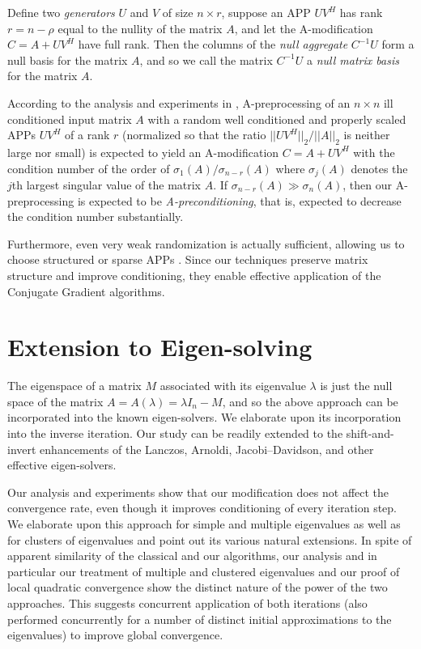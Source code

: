 \documentclass{report}
\begin{document}
Define two {\em generators} $U$ and $V$ of size $n \times r$, suppose an
APP $UV^H$ has rank $r=n-\rho$ equal to the nullity of the matrix $A$,
and let the A-modification $C=A+UV^H$ have full rank. Then the columns of
the {\em null aggregate} $C^{-1}U$ form a null basis for the matrix $A$,
and so we call the matrix $C^{-1}U$ a {\em null matrix basis} for the
matrix $A$.

According to the analysis and experiments in \cite{apf},
A-preprocessing of an $n\times n$ ill conditioned input matrix $A$ with a
random well conditioned and properly scaled APPs $UV^H$ of a rank $r$
(normalized so that the ratio $||UV^H||_2/||A||_2$ is neither large nor
small) is expected to yield an A-modification $C=A+UV^H$ with the
condition number of the order of $\sigma_{1}(A)/\sigma_{n-r}(A)$ where
$\sigma_j(A)$ denotes the $j$th largest singular value of the matrix $A$.
If $\sigma_{n-r}(A)\gg \sigma_{n}(A)$, then our A-preprocessing is
expected to be {\em A-preconditioning}, that is, expected to decrease the
condition number substantially.

Furthermore, even very weak randomization is actually sufficient,
allowing us to choose structured or sparse APPs \cite[Examples
4.1--4.6]{apf}. Since our techniques preserve matrix structure and
improve conditioning, they enable effective application of the Conjugate
Gradient algorithms.

\section{Extension to Eigen-solving}\label{s3}

The eigenspace of a matrix $M$ associated with its eigenvalue $\lambda$
is just the null space of the matrix $A=A(\lambda)=\lambda I_n-M$, and so
the above approach can be incorporated into the known eigen-solvers. We
elaborate upon its incorporation into the inverse iteration. Our study
can be readily extended to the shift-\-and-\-invert enhancements of the
Lanczos, Arnoldi, Jacobi--Davidson, and other effective eigen-solvers.

Our analysis and experiments show that our modification does not affect
the convergence rate, even though it improves conditioning of every
iteration step. We elaborate upon this approach for simple and multiple
eigenvalues as well as for clusters of eigenvalues and point out its
various natural extensions. In spite of apparent similarity of the
classical and our algorithms, our analysis and in particular our
treatment of multiple and clustered eigenvalues and our proof of local
quadratic convergence show the distinct nature of the power of the two
approaches. This suggests concurrent application of both iterations (also
performed concurrently for a number of distinct initial approximations to
the eigenvalues) to improve global convergence.
\end{document}
